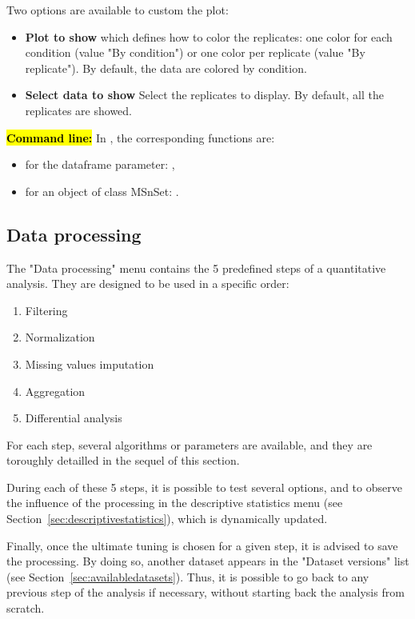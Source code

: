 \documentclass[12pt]{article}
\begin{document}
{Two options are available to custom the plot:
\begin{itemize}
  \item \textbf{Plot to show} which defines how to color the replicates: one color for each condition (value "By condition") or one color per replicate (value "By replicate"). By default, the data are colored by condition.
  \item \textbf{Select data to show} Select the replicates to display. By default, all the replicates are showed.
\end {itemize}
}


\hl{\bf Command line:} In , the corresponding functions are:
\begin{itemize}
\item for the dataframe parameter: ,
\item for an object of class MSnSet: .
\end{itemize}


\subsection{Data processing}\label{sec:processingadataset}

The "Data processing" menu contains the 5 predefined steps of a quantitative analysis. They are designed to be used in a specific order:
\begin{enumerate}
\item {Filtering}
\item{Normalization}
\item{Missing values imputation}
\item{Aggregation}
\item{Differential analysis}
\end{enumerate}
For each step, several algorithms or parameters are available, and they are toroughly detailled in the sequel of this section.

During each of these 5 steps, it is possible to test several options, and to observe the influence of the processing in the descriptive statistics menu (see Section~\ref{sec:descriptivestatistics}), which is dynamically updated. 

Finally, once the ultimate tuning is chosen for a given step, it is advised to save the processing. By doing so, another dataset appears in the "Dataset versions" list (see Section~\ref{sec:availabledatasets}). Thus, it is possible to go back to any previous step of the analysis if necessary, without starting back the analysis from scratch.
\end{document}
